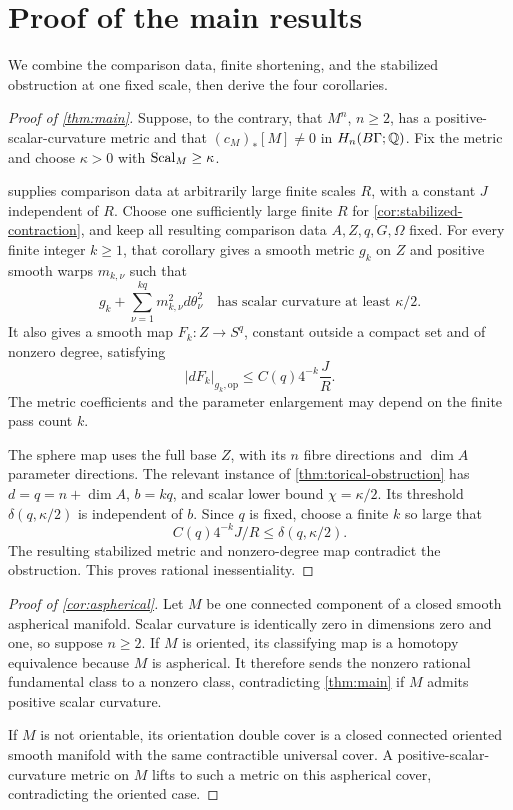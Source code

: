 \section{Proof of the main results}
\label{sec:main-proof}

We combine the comparison data, finite shortening, and the stabilized
obstruction at one fixed scale, then derive the four corollaries.

\begin{proof}[Proof of \cref{thm:main}]
Suppose, to the contrary, that $M^n$, $n\ge2$, has a positive-scalar-curvature
metric and that $(c_M)_*[M]\ne0$ in $H_n(B\Gamma;\mathbb Q)$. Fix the metric and
choose $\kappa>0$ with $\operatorname{Scal}_M\ge\kappa$.

 supplies comparison data at arbitrarily large
finite scales $R$, with a constant $J$ independent of $R$. Choose one
sufficiently large finite $R$ for \cref{cor:stabilized-contraction}, and keep
all resulting comparison data $A,Z,q,G,\Omega$ fixed.
For every finite integer $k\ge1$, that corollary gives a smooth metric $g_k$
on $Z$ and positive smooth warps $m_{k,\nu}$ such that
\[
 g_k+\sum_{\nu=1}^{kq}m_{k,\nu}^2d\theta_\nu^2
 \quad\text{has scalar curvature at least }\kappa/2.
\]
It also gives a smooth map $F_k:Z\to S^q$, constant outside a compact set
and of nonzero degree, satisfying
\[
 |dF_k|_{g_k,\mathrm{op}}\le C(q)4^{-k}\frac{J}{R}.
\]
The metric coefficients and the parameter enlargement may depend on the
finite pass count $k$.

The sphere map uses the full base $Z$, with its $n$ fibre directions and
$\dim A$ parameter directions. The relevant instance of
\cref{thm:torical-obstruction} has $d=q=n+\dim A$, $b=kq$, and scalar lower
bound $\chi=\kappa/2$.
Its threshold $\delta(q,\kappa/2)$ is independent of $b$. Since $q$ is
fixed, choose a finite $k$ so large that
\[
 C(q)4^{-k}J/R\le\delta(q,\kappa/2).
\]
The resulting stabilized metric and nonzero-degree map contradict the
obstruction. This proves rational inessentiality.
\end{proof}

\begin{proof}[Proof of \cref{cor:aspherical}]
Let $M$ be one connected component of a closed smooth aspherical manifold.
Scalar curvature is identically zero in dimensions zero and one, so suppose
$n\ge2$. If $M$ is oriented, its classifying map is a homotopy equivalence
because $M$ is aspherical. It therefore sends the nonzero rational fundamental
class to a nonzero class, contradicting \cref{thm:main} if $M$ admits positive
scalar curvature.

If $M$ is not orientable, its orientation double cover is a closed connected
oriented smooth manifold with the same contractible universal cover. A
positive-scalar-curvature metric on $M$ lifts to such a metric on this
aspherical cover, contradicting the oriented case.
\end{proof}

